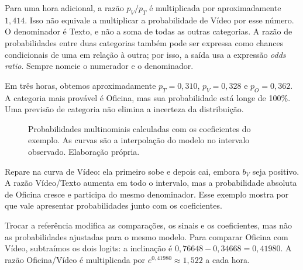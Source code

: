 Para uma hora adicional, a razão $p_V/p_T$ é multiplicada por aproximadamente $1{,}414$. Isso não equivale a multiplicar a probabilidade de Vídeo por esse número. O denominador é Texto, e não a soma de todas as outras categorias. A razão de probabilidades entre duas categorias também pode ser expressa como chances condicionais de uma em relação à outra; por isso, a saída usa a expressão \textit{odds ratio}. Sempre nomeie o numerador e o denominador.

Em três horas, obtemos aproximadamente $p_T=0{,}310$, $p_V=0{,}328$ e $p_O=0{,}362$. A categoria mais provável é Oficina, mas sua probabilidade está longe de 100\%. Uma previsão de categoria não elimina a incerteza da distribuição.

\begin{figure}[H]
\centering
{}
\caption{Probabilidades multinomiais calculadas com os coeficientes do exemplo. As curvas são a interpolação do modelo no intervalo observado. Elaboração própria.}
\label{fig:multinomial-probabilidades}
\end{figure}

Repare na curva de Vídeo: ela primeiro sobe e depois cai, embora $b_V$ seja positivo. A razão Vídeo/Texto aumenta em todo o intervalo, mas a probabilidade absoluta de Oficina cresce e participa do mesmo denominador. Esse exemplo mostra por que vale apresentar probabilidades junto com os coeficientes.

Trocar a referência modifica as comparações, os sinais e os coeficientes, mas não as probabilidades ajustadas para o mesmo modelo. Para comparar Oficina com Vídeo, subtraímos os dois logits: a inclinação é $0{,}76648-0{,}34668=0{,}41980$. A razão Oficina/Vídeo é multiplicada por $e^{0{,}41980}\approx1{,}522$ a cada hora.

